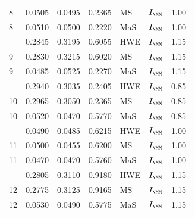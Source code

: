\begin{table}[H]
{\begin{tabular}[t]{lllllll}
8 & 0.0505 & 0.0495 & 0.2365 & MS & $I_{\MM}$ & 1.00\\
8 & 0.0510 & 0.0500 & 0.2220 & MaS & $I_{\MM}$ & 1.00\\
\addlinespace
9 & 0.2845 & 0.3195 & 0.6055 & HWE & $I_{\MM}$ & 1.15\\
9 & 0.2830 & 0.3215 & 0.6020 & MS & $I_{\MM}$ & 1.15\\
9 & 0.0485 & 0.0525 & 0.2270 & MaS & $I_{\MM}$ & 1.15\\
\addlinespace
10 & 0.2940 & 0.3035 & 0.2405 & HWE & $I_{\MM}$ & 0.85\\
10 & 0.2965 & 0.3050 & 0.2365 & MS & $I_{\MM}$ & 0.85\\
10 & 0.0520 & 0.0470 & 0.5770 & MaS & $I_{\MM}$ & 0.85\\
\addlinespace
11 & 0.0490 & 0.0485 & 0.6215 & HWE & $I_{\MM}$ & 1.00\\
11 & 0.0500 & 0.0455 & 0.6200 & MS & $I_{\MM}$ & 1.00\\
11 & 0.0470 & 0.0470 & 0.5760 & MaS & $I_{\MM}$ & 1.00\\
\addlinespace
12 & 0.2805 & 0.3110 & 0.9180 & HWE & $I_{\MM}$ & 1.15\\
12 & 0.2775 & 0.3125 & 0.9165 & MS & $I_{\MM}$ & 1.15\\
12 & 0.0530 & 0.0490 & 0.5775 & MaS & $I_{\MM}$ & 1.15\\
\bottomrule
\end{tabular}}
\end{table}